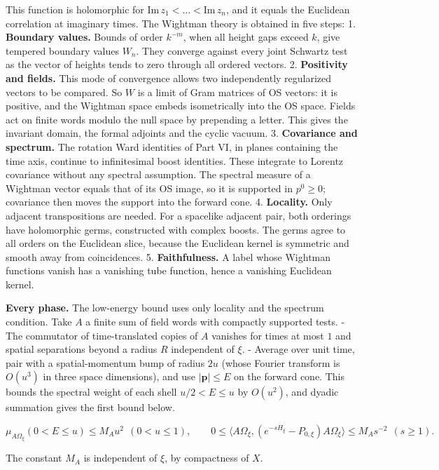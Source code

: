 \documentclass[
  letterpaper,
  11pt]{article}
\begin{document}
This function is holomorphic for
\(\mathrm{Im}\,z_1<\dots<\mathrm{Im}\,z_n\), and it equals the Euclidean
correlation at imaginary times. The Wightman theory is obtained in five
steps: 1. \textbf{Boundary values.} Bounds of order \(k^{-m}\), when all
height gaps exceed \(k\), give tempered boundary values \(W_n\). They
converge against every joint Schwartz test as the vector of heights
tends to zero through all ordered vectors. 2. \textbf{Positivity and
fields.} This mode of convergence allows two independently regularized
vectors to be compared. So \(W\) is a limit of Gram matrices of OS
vectors: it is positive, and the Wightman space embeds isometrically
into the OS space. Fields act on finite words modulo the null space by
prepending a letter. This gives the invariant domain, the formal
adjoints and the cyclic vacuum. 3. \textbf{Covariance and spectrum.} The
rotation Ward identities of Part VI, in planes containing the time axis,
continue to infinitesimal boost identities. These integrate to Lorentz
covariance without any spectral assumption. The spectral measure of a
Wightman vector equals that of its OS image, so it is supported in
\(p^0\ge0\); covariance then moves the support into the forward cone. 4.
\textbf{Locality.} Only adjacent transpositions are needed. For a
spacelike adjacent pair, both orderings have holomorphic germs,
constructed with complex boosts. The germs agree to all orders on the
Euclidean slice, because the Euclidean kernel is symmetric and smooth
away from coincidences. 5. \textbf{Faithfulness.} A label whose Wightman
functions vanish has a vanishing tube function, hence a vanishing
Euclidean kernel.

\textbf{Every phase.} The low-energy bound uses only locality and the
spectrum condition. Take \(A\) a finite sum of field words with
compactly supported tests. - The commutator of time-translated copies of
\(A\) vanishes for times at most \(1\) and spatial separations beyond a
radius \(R\) independent of \(\xi\). - Average over unit time, pair with
a spatial-momentum bump of radius \(2u\) (whose Fourier transform is
\(O(u^3)\) in three space dimensions), and use \(|\mathbf p|\le E\) on
the forward cone. This bounds the spectral weight of each shell
\(u/2<E\le u\) by \(O(u^2)\), and dyadic summation gives the first bound
below.

\[\mu_{A\Omega_\xi}(0<E\le u)\le M_Au^2\ \ (0<u\le1),\qquad 0\le\big\langle A\Omega_\xi,(e^{-sH_\xi}-P_{0,\xi})A\Omega_\xi\big\rangle\le M_As^{-2}\ \ (s\ge1).\]

The constant \(M_A\) is independent of \(\xi\), by compactness of \(X\).
\end{document}
